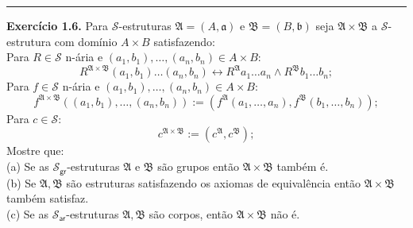 \documentclass[11pt]{article}
\theoremstyle{definition}
\newcommand{\sse}{\leftrightarrow}
\newcommand{\mc}[1]{\mathcal{#1}}
\newcommand{\mf}[1]{\mathfrak{#1}}
\newcommand{\msf}[1]{\mathsf{#1}}
\begin{document}
\hrule

\textbf{Exercício 1.6.}
Para $\mc{S}$-estruturas $\mf{A}=(A,\mf{a})$ e $\mf{B}=(B,\mf{b})$ seja $\mf{A}\times\mf{B}$ a $\mc{S}$-estrutura com domínio $A\times B$ satisfazendo:\\
Para $R\in\mc{S}$ n-ária e $(a_1,b_1),\dots,(a_n,b_n)\in A\times B$:
\[
R^{\mf{A}\times\mf{B}}(a_1,b_1)\dots(a_n,b_n)\sse R^\mf{A}a_1\dots a_n\wedge R^\mf{B}b_1\dots b_n;
\]
Para $f\in\mc{S}$ n-ária e $(a_1,b_1),\dots,(a_n,b_n)\in A\times B$:
\[
f^{\mf{A}\times\mf{B}}((a_1,b_1),\dots,(a_n,b_n)):=(f^\mf{A}(a_1,\dots,a_n),f^\mf{B}(b_1,\dots,b_n));
\]
Para $c\in\mc{S}$:
\[
c^{\mf{A}\times\mf{B}}:=(c^\mf{A},c^\mf{B});
\]
Mostre que:\\
(a) Se as $\mc{S}_{\msf{gr}}$-estruturas $\mf{A}$ e $\mf{B}$ são grupos então $\mf{A}\times\mf{B}$ também é.\\
(b) Se $\mf{A},\mf{B}$ são estruturas satisfazendo os axiomas de equivalência então $\mf{A}\times\mf{B}$ também satisfaz.\\
(c) Se as $\mc{S}_{\msf{ar}}$-estruturas $\mf{A},\mf{B}$ são corpos, então $\mf{A}\times\mf{B}$ não é.
\end{document}
